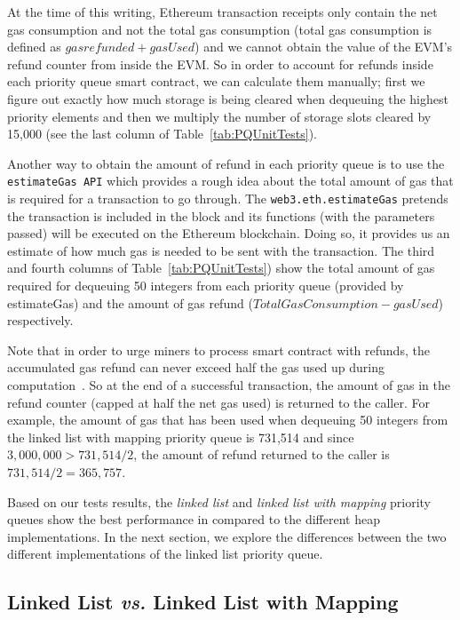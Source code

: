 At the time of this writing, Ethereum transaction receipts only contain the net gas consumption and not the total gas consumption (total gas consumption is defined as $gas refunded + gasUsed$) and we cannot obtain the value of the EVM's refund counter from inside the EVM. So in order to account for refunds inside each priority queue smart contract, we can calculate them manually; first we figure out exactly how much storage is being cleared when dequeuing the highest priority elements and then we multiply the number of storage slots cleared by 15,000 (see the last column of Table~\ref{tab:PQUnitTests}).

Another way to obtain the amount of refund in each priority queue is to use the \texttt{estimateGas API} which provides a rough idea about the total amount of gas that is required for a transaction to go through. The \texttt{web3.eth.estimateGas} pretends the transaction is included in the block and its functions (with the parameters passed) will be executed on the Ethereum blockchain. Doing so, it provides us an estimate of how much gas is needed to be sent with the transaction. The third and fourth columns of Table~\ref{tab:PQUnitTests}) show the total amount of gas required for dequeuing 50 integers from each priority queue (provided by estimateGas) and the amount of gas refund ($Total Gas Consumption - gasUsed$) respectively.

Note that in order to urge miners to process smart contract with refunds, the accumulated gas refund can never exceed half the gas used up during computation~\cite{wood2014ethereum}. So at the end of a successful transaction, the amount of gas in the refund counter (capped at half the net gas used) is returned to the caller. For example, the amount of gas that has been used when dequeuing 50 integers from the linked list with mapping priority queue is 731,514 and since $3,000,000 > 731,514/2$, the amount of refund returned to the caller is $731,514/2 = 365,757$.

Based on our tests results, the \textit{linked list} and \textit{linked list with mapping} priority queues show the best performance in compared to the different heap implementations. In the next section, we explore the differences between the two different implementations of the linked list priority queue.


\subsection{Linked List \textit{vs.} Linked List with Mapping}



